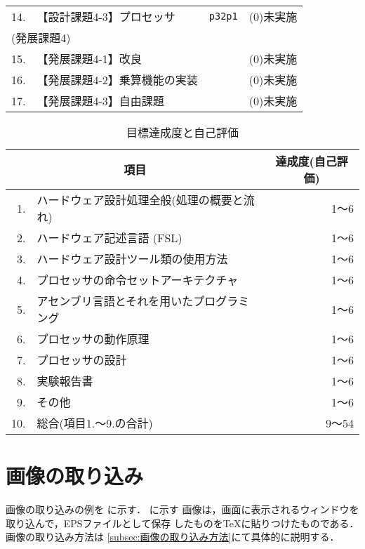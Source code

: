 \documentclass{jarticle}[11pt]
\newcommand{\figref}[1]{\makebox{図~\ref{#1}}}
\begin{document}
\begin{table}[tb]
\begin{center}
{\begin{tabular}{rll|l}
    14. & 【設計課題4-3】プロセッサ      & \verb|p32p1|          & (0)未実施 \\
    \multicolumn{3}{l|}{(発展課題4)} & \\
    15. & 【発展課題4-1】改良            &                       & (0)未実施 \\
    16. & 【発展課題4-2】乗算機能の実装  &                       & (0)未実施 \\
    17. & 【発展課題4-3】自由課題        &                       & (0)未実施 \\
    \hline
    \end{tabular}
    }
    \end{center}
    \end{table}
     
     
     
    \begin{table}[tb]
    \caption{目標達成度と自己評価}
    \label{tab:目標達成度と自己評価}
    \begin{center}
    {\small
    \begin{tabular}{rl|r}
    \hline
    \hline
    \multicolumn{2}{c|}{項目} & \multicolumn{1}{c}{達成度(自己評価)} \\
    \hline
    1. & ハードウェア設計処理全般(処理の概要と流れ) & 1〜6 \\
    2. & ハードウェア記述言語 (FSL) & 1〜6 \\
    3. & ハードウェア設計ツール類の使用方法 & 1〜6 \\
    4. & プロセッサの命令セットアーキテクチャ & 1〜6 \\
    5. & アセンブリ言語とそれを用いたプログラミング & 1〜6 \\
    6. & プロセッサの動作原理 & 1〜6 \\
    7. & プロセッサの設計 & 1〜6 \\
    8. & 実験報告書 & 1〜6 \\
    9. & その他 & 1〜6 \\
    \hline
    10. & 総合(項目1.〜9.の合計) & 9〜54 \\
    \hline
    \end{tabular}
    }
    \end{center}
    \end{table}
     
     
    \section{画像の取り込み}
    画像の取り込みの例を
    \figref{fig:4ビットカウンタをシミュレーションした際の信号波形}に示す．
    \figref{fig:4ビットカウンタをシミュレーションした際の信号波形}に示す
    画像は，画面に表示されるウィンドウを取り込んで，EPSファイルとして保存
    したものをTeXに貼りつけたものである．画像の取り込み方法は
    \ref{subsec:画像の取り込み方法}にて具体的に説明する．
     
\end{document}
